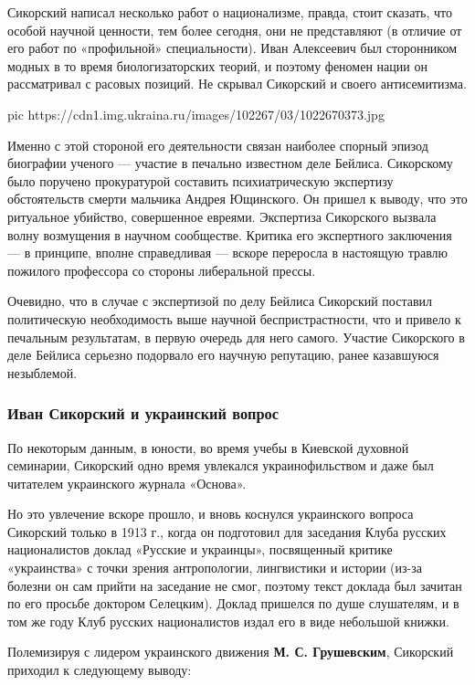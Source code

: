 Сикорский написал несколько работ о национализме, правда, стоит сказать, что
особой научной ценности, тем более сегодня, они не представляют (в отличие от
его работ по «профильной» специальности). Иван Алексеевич был сторонником
модных в то время биологизаторских теорий, и поэтому феномен нации он
рассматривал с расовых позиций. Не скрывал Сикорский и своего антисемитизма.

\ifcmt
pic https://cdn1.img.ukraina.ru/images/102267/03/1022670373.jpg
\fi

Именно с этой стороной его деятельности связан наиболее спорный эпизод
биографии ученого — участие в печально известном деле Бейлиса. Сикорскому было
поручено прокуратурой составить психиатрическую экспертизу обстоятельств смерти
мальчика Андрея Ющинского. Он пришел к выводу, что это ритуальное убийство,
совершенное евреями. Экспертиза Сикорского вызвала волну возмущения в научном
сообществе. Критика его экспертного заключения — в принципе, вполне
справедливая — вскоре переросла в настоящую травлю пожилого профессора со
стороны либеральной прессы.

Очевидно, что в случае с экспертизой по делу Бейлиса Сикорский поставил
политическую необходимость выше научной беспристрастности, что и привело к
печальным результатам, в первую очередь для него самого. Участие Сикорского в
деле Бейлиса серьезно подорвало его научную репутацию, ранее казавшуюся
незыблемой.

\subsubsection{Иван Сикорский и украинский вопрос}

По некоторым данным, в юности, во время учебы в Киевской духовной семинарии,
Сикорский одно время увлекался украинофильством и даже был читателем
украинского журнала «Основа».

Но это увлечение вскоре прошло, и вновь коснулся украинского вопроса Сикорский
только в 1913 г., когда он подготовил для заседания Клуба русских националистов
доклад «Русские и украинцы», посвященный критике «украинства» с точки зрения
антропологии, лингвистики и истории (из-за болезни он сам прийти на заседание
не смог, поэтому текст доклада был зачитан по его просьбе доктором Селецким).
Доклад пришелся по душе слушателям, и в том же году Клуб русских националистов
издал его в виде небольшой книжки.

Полемизируя с лидером украинского движения \textbf{М. С. Грушевским}, Сикорский приходил
к следующему выводу: 

